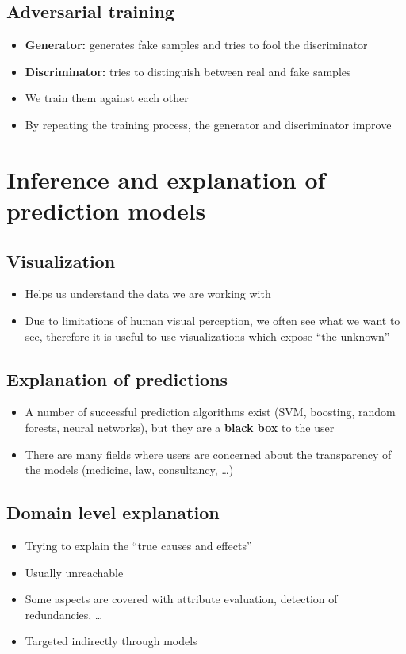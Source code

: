 \documentclass{article}
\begin{document}
        \subsection{Adversarial training}
        \begin{itemize}
            \item \textbf{Generator:} generates fake samples and tries to fool the discriminator
            \item \textbf{Discriminator:} tries to distinguish between real and fake samples
            \item We train them against each other
            \item By repeating the training process, the generator and discriminator improve
        \end{itemize}

    \newpage

\section{Inference and explanation of prediction models}
    \subsection{Visualization}
    \begin{itemize}
        \item Helps us understand the data we are working with
        \item Due to limitations of human visual perception, we often see what we want to see, therefore it is useful to use visualizations which expose ``the unknown''
    \end{itemize}

    \subsection{Explanation of predictions}
    \begin{itemize}
        \item A number of successful prediction algorithms exist (SVM, boosting, random forests, neural networks), but they are a \textbf{black box} to the user
        \item There are many fields where users are concerned about the transparency of the models (medicine, law, consultancy, \ldots)
    \end{itemize}

    \subsection{Domain level explanation}
    \begin{itemize}
        \item Trying to explain the ``true causes and effects''
        \item Usually unreachable
        \item Some aspects are covered with attribute evaluation, detection of redundancies, \ldots
        \item Targeted indirectly through models
    \end{itemize}
\end{document}

